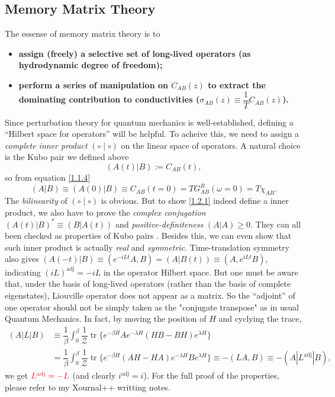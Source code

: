 \documentclass[10pt,nofootinbib,letterpaper]{revtex4}
\newcounter{Note}[section]
\newenvironment{Note}[1][]{{\par\normalfont\bfseries \underline{Note~\stepcounter{Note}\arabic{Note}.}~#1~~}}{\par}
\begin{document}
	\subsection{Memory Matrix Theory}
		The essense of memory matrix theory is to
		\begin{itemize}
			\item \textbf{assign (freely) a selective set of long-lived operators (as hydrodynamic degree of freedom);}
			\item \textbf{perform a series of manipulation on $C_{AB}(z)$ to extract the dominating contribution to conductivities ($\sigma_{AB}(z)\equiv\dfrac{1}{T}C_{AB}(z)$).}
		\end{itemize}
		Since perturbation theory for quantum mechanics is well-established, defining a ``Hilbert space for operators'' will be helpful. To acheive this, we need to assign a \emph{complete inner product} $(\circ\mid\circ)$ on the linear space of operators. A natural choice is the Kubo pair we defined above
		\begin{equation}\label{1.2.1}
			(A(t)|B):=C_{AB}(t),
		\end{equation}
		so from equation \eqref{1.1.4}
		\begin{equation}\label{1.2.2}
			(A|B)\equiv(A(0)|B)\equiv C_{AB}(t=0)=T G^R_{AB}(\omega=0)=T\chi_{AB}.
		\end{equation}
		\begin{Note}
			The \emph{bilinearity} of $(\circ\mid\circ)$ is obvious. But to show \eqref{1.2.1} indeed define a inner product, we also have to prove the \emph{complex conjugation} $(A(t)|B)^*\equiv(B|A(t))$ and \emph{positive-definiteness} $(A|A)\geq0$. They can all been checked as properties of Kubo pairs \cite{kubo1957statistical,forster2018hydrodynamic}. Besides this, we can even show that such inner product is actually \emph{real} and \emph{symmetric}. Time-translation symmetry also gives $(A(-t)|B)\equiv(e^{-iLt}A,B)=(A|B(t))\equiv(A,e^{iLt}B)$, indicating $(iL)^{\mathrm{adj}}=-iL$ in the operator Hilbert space. But one must be aware that, {\color{red}under the basis of long-lived operators (rather than the basis of complete eigenstates), Liouville operator does not appear as a matrix. So the ``adjoint'' of one operator should not be simply taken as the "conjugate transpose" as in usual Quantum Mechanics}. In fact, by moving the position of $H$ and cyclying the trace,
			\begin{align*}
				(A|L|B)&\equiv\dfrac{1}{\beta}\int_0^\beta\dfrac{1}{\mathcal{Z}}\mathop{\mathrm{tr}}\bigg\{e^{-\beta H}Ae^{-\lambda H}(HB-BH)e^{\lambda H}\bigg\}\\
				&=\dfrac{1}{\beta}\int_0^\beta\dfrac{1}{\mathcal{Z}}\mathop{\mathrm{tr}}\bigg\{e^{-\beta H}(AH-HA)e^{-\lambda H}Be^{\lambda H}\bigg\}\equiv-(LA,B)\equiv-(A|L^{\mathrm{adj}}|B),
			\end{align*}
			we get ${\color{red}L^{\mathrm{adj}}=-L}$ (and clearly $i^{\mathrm{adj}}=i$). For the full proof of the properties, please refer to my Xournal++ writting notes.
		\end{Note}
\end{document}
